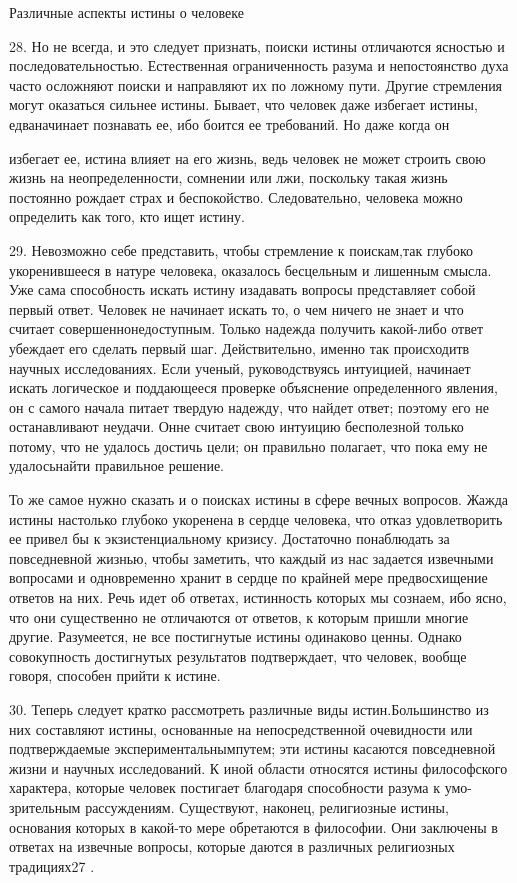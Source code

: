 \documentclass[a5paper,10pt]{article}
\begin{document}
Различные аспекты истины о человеке

28. Но не всегда, и это следует признать, поиски истины отличаются ясностью и
последовательностью. Естественная ограниченность разума и непостоянство духа
часто осложняют поиски и направляют их по ложному пути. Другие стремления могут
оказаться сильнее истины. Бывает, что человек даже избегает истины,
едваначинает познавать ее, ибо боится ее требований. Но даже когда он

избегает ее, истина влияет на его жизнь, ведь человек не может строить свою
жизнь на неопределенности, сомнении или лжи, поскольку такая жизнь постоянно
рождает страх и беспокойство. Следовательно, человека можно определить как
того, кто ищет истину.

29. Невозможно себе представить, чтобы стремление к поискам,так глубоко
укоренившееся в натуре человека, оказалось бесцельным и лишенным смысла. Уже
сама способность искать истину изадавать вопросы представляет собой первый
ответ. Человек не начинает искать то, о чем ничего не знает и что считает
совершеннонедоступным. Только надежда получить какой-либо ответ убеждает его
сделать первый шаг. Действительно, именно так происходитв научных
исследованиях. Если ученый, руководствуясь интуицией, начинает искать
логическое и поддающееся проверке объяснение определенного явления, он с самого
начала питает твердую надежду, что найдет ответ; поэтому его не останавливают
неудачи. Онне считает свою интуицию бесполезной только потому, что не удалось
достичь цели; он правильно полагает, что пока ему не удалосьнайти правильное
решение.

То же самое нужно сказать и о поисках истины в сфере вечных вопросов. Жажда
истины настолько глубоко укоренена в сердце человека, что отказ удовлетворить
ее привел бы к экзистенциальному кризису. Достаточно понаблюдать за
повседневной жизнью, чтобы заметить, что каждый из нас задается извечными
вопросами и одновременно хранит в сердце по крайней мере предвосхищение ответов
на них. Речь идет об ответах, истинность которых мы сознаем, ибо ясно, что они
существенно не отличаются от ответов, к которым пришли многие другие.
Разумеется, не все постигнутые истины одинаково ценны. Однако совокупность
достигнутых результатов подтверждает, что человек, вообще говоря, способен
прийти к истине.

30. Теперь следует кратко рассмотреть различные виды истин.Большинство из них
составляют истины, основанные на непосредственной очевидности или
подтверждаемые экспериментальнымпутем; эти истины касаются повседневной жизни и
научных исследований. К иной области относятся истины философского характера,
которые человек постигает благодаря способности разума к умо-зрительным
рассуждениям. Существуют, наконец, религиозные истины, основания которых в
какой-то мере обретаются в философии. Они заключены в ответах на извечные
вопросы, которые даются в различных религиозных традициях27 .
\end{document}
